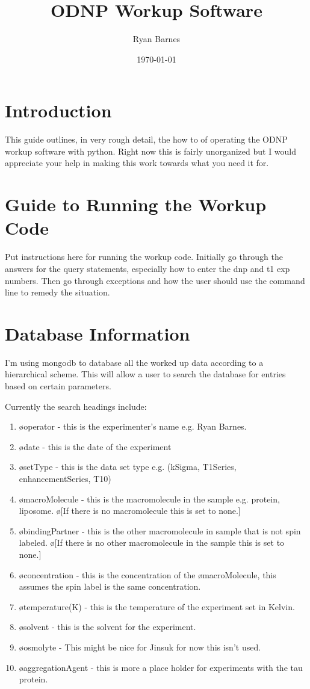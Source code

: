 \documentclass[10pt]{book}
\author{Ryan Barnes}
\title{ODNP Workup Software}
\date{\today}
\begin{document}
\maketitle
\chapter{Introduction}
This guide outlines, in very rough detail, the how to of operating the ODNP workup software with python. Right now this is fairly unorganized but I would appreciate your help in making this work towards what you need it for. 

\chapter{Guide to Running the Workup Code}
Put instructions here for running the workup code. Initially go through the answers for the query statements, especially how to enter the dnp and t1 exp numbers. Then go through exceptions and how the user should use the command line to remedy the situation.

\chapter{Database Information}
I'm using mongodb to database all the worked up data according to a hierarchical scheme. This will allow a user to search the database for entries based on certain parameters. 

Currently the search headings include:
\begin{enumerate}
    \item \o{operator} - this is the experimenter's name e.g. Ryan Barnes.
    \item \o{date} - this is the date of the experiment
    \item \o{setType} - this is the data set type e.g. (kSigma, T1Series, enhancementSeries, T10)
    \item \o{macroMolecule} - this is the macromolecule in the sample e.g. protein, liposome. \o[If there is no macromolecule this is set to none.]{} 
    \item \o{bindingPartner} - this is the other macromolecule in sample that is not spin labeled. \o[If there is no other macromolecule in the sample this is set to none.]{} 
    \item \o{concentration} - this is the concentration of the \o{macroMolecule}, this assumes the spin label is the same concentration.
    \item \o{temperature(K)} - this is the temperature of the experiment set in Kelvin.
    \item \o{solvent} - this is the solvent for the experiment.
    \item \o{osmolyte} - This might be nice for Jinsuk for now this isn't used.
    \item \o{aggregationAgent} - this is more a place holder for experiments with the tau protein.
\end{enumerate}
\end{document}
